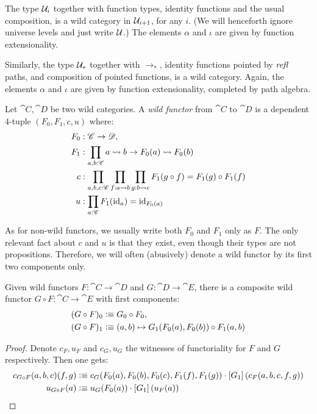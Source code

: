 \documentclass[english,a4]{article}
\renewcommand{\ap}[1]{\left[{#1}\right]}
\newcommand{\ptdto}{\to_\ast}%
\newcommand{\UUptd}{\UU_{\ast}}
\begin{document}
\begin{example}
  The type $\mathcal{U}_i$ together with function types, identity functions and the
	usual composition, is a wild category in $\mathcal{U}_{i+1}$, for any $i$. (We will henceforth ignore universe levels and just write $\mathcal{U}$.) The elements $\alpha$ and $\iota$ are
  given by function extensionality.
 
  Similarly, the type $\UUptd$ together with $\ptdto$, identity functions
  pointed by $\mathop{{\mathit{refl}}_{}}$ paths, and composition of pointed functions, is a wild
  category. Again, the elements $\alpha$ and $\iota$ are given by function
  extensionality, completed by path algebra.
\end{example}

\begin{definition}
  Let $\cat C,\cat D$ be two wild categories.
  A \emph{wild functor} from $\cat C$ to $\cat D$ is a dependent $4$-tuple $(F_0,F_1,c,u)$ where:
  \begin{align*}
    F_0 &:\cat C \to \cat D,\\
    F_1 &:\prod_{a,b:\cat C} \hom(a,b) \to \hom(F_0(a), F_0(b))\\
    c &: \prod_{a,b,c:\cat C}\prod_{f:\hom(a,b)}\prod_{g:\hom(b,c)}F_1(g\circ f) = F_1(g) \circ F_1(f)\\
    u &: \prod_{a:\cat C} F_1(\id_a) = \id_{F_0(a)}
  \end{align*}
  \label{def:wild-functor}
\end{definition}

As for non-wild functors, we usually write both $F_0$ and $ F_1$ only as $F$.
The only relevant fact about $c$ and $u$ is that they exist, even though their
types are not propositions. Therefore, we will often (abusively) denote a wild
functor by its first two components only.

\begin{proposition}
  Given wild functors $F:\cat C \to \cat D$ and $G:\cat D \to \cat E$, there is a composite wild functor $G\circ F :\cat C \to \cat E$ with first components:
  \begin{align*}
    (G\circ F)_0 &\vcentcolon\equiv G_0\circ F_0, \\ 
    (G\circ F)_1 &\vcentcolon\equiv (a,b) \mapsto G_1(F_0(a),F_0(b)) \circ F_1(a,b)
  \end{align*}
  \label{prop:composition-wild-functors}
\end{proposition}
\begin{proof}
  Denote $c_F, u_F$ and $c_G,u_G$ the witnesses of functoriality for $F$ and
  $G$ respectively. Then one gets:
  \begin{align*}
    c_{G\circ F}(a,b,c)(f,g) &\defequi c_G(F_0(a),F_0(b),F_0(c),F_1(f),F_1(g)) \cdot \ap{G_1} ( c_F(a,b,c,f,g) ) \\
    u_{G\circ F}(a) &\defequi u_G(F_0(a)) \cdot \ap {G_1} (u_F(a))
  \end{align*}
\end{proof}
\end{document}

